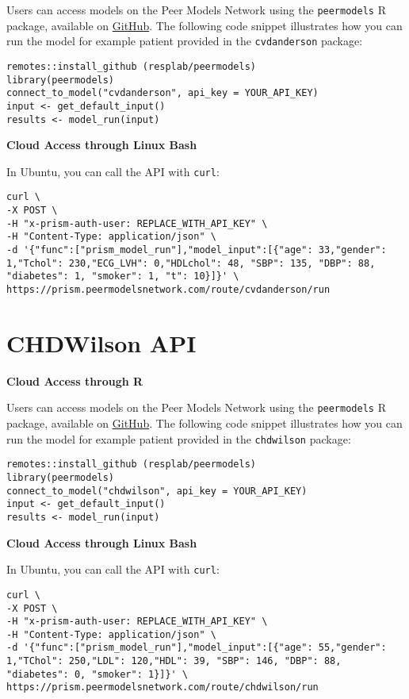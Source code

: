 \documentclass[
]{book}
\begin{document}
Users can access models on the Peer Models Network using the \texttt{peermodels} R package, available on \href{https://github.com/resplab/peermodels}{GitHub}. The following code snippet illustrates how you can run the model for example patient provided in the \texttt{cvdanderson} package:

\begin{verbatim}
remotes::install_github (resplab/peermodels)
library(peermodels)
connect_to_model("cvdanderson", api_key = YOUR_API_KEY)
input <- get_default_input()
results <- model_run(input)
\end{verbatim}

\textbf{Cloud Access through Linux Bash}

In Ubuntu, you can call the API with \texttt{curl}:

\begin{verbatim}
curl \
-X POST \
-H "x-prism-auth-user: REPLACE_WITH_API_KEY" \
-H "Content-Type: application/json" \
-d '{"func":["prism_model_run"],"model_input":[{"age": 33,"gender": 1,"Tchol": 230,"ECG_LVH": 0,"HDLchol": 48, "SBP": 135, "DBP": 88, "diabetes": 1, "smoker": 1, "t": 10}]}' \
https://prism.peermodelsnetwork.com/route/cvdanderson/run
\end{verbatim}

\hypertarget{chdwilson-api}{%
\section{CHDWilson API}\label{chdwilson-api}}

\textbf{Cloud Access through R}

Users can access models on the Peer Models Network using the \texttt{peermodels} R package, available on \href{https://github.com/resplab/peermodels}{GitHub}. The following code snippet illustrates how you can run the model for example patient provided in the \texttt{chdwilson} package:

\begin{verbatim}
remotes::install_github (resplab/peermodels)
library(peermodels)
connect_to_model("chdwilson", api_key = YOUR_API_KEY)
input <- get_default_input()
results <- model_run(input)
\end{verbatim}

\textbf{Cloud Access through Linux Bash}

In Ubuntu, you can call the API with \texttt{curl}:

\begin{verbatim}
curl \
-X POST \
-H "x-prism-auth-user: REPLACE_WITH_API_KEY" \
-H "Content-Type: application/json" \
-d '{"func":["prism_model_run"],"model_input":[{"age": 55,"gender": 1,"TChol": 250,"LDL": 120,"HDL": 39, "SBP": 146, "DBP": 88, "diabetes": 0, "smoker": 1}]}' \
https://prism.peermodelsnetwork.com/route/chdwilson/run
\end{verbatim}
\end{document}
